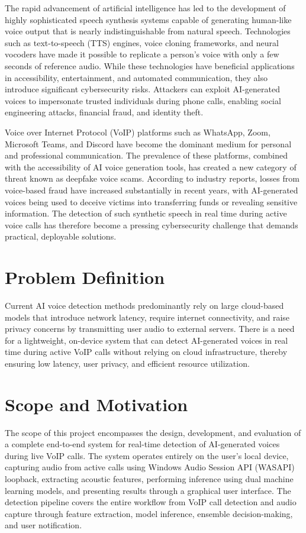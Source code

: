 \documentclass[12pt,a4paper,titlepage]{report}
\begin{document}
	The rapid advancement of artificial intelligence has led to the development of highly sophisticated speech synthesis systems capable of generating human-like voice output that is nearly indistinguishable from natural speech. Technologies such as text-to-speech (TTS) engines, voice cloning frameworks, and neural vocoders have made it possible to replicate a person's voice with only a few seconds of reference audio. While these technologies have beneficial applications in accessibility, entertainment, and automated communication, they also introduce significant cybersecurity risks. Attackers can exploit AI-generated voices to impersonate trusted individuals during phone calls, enabling social engineering attacks, financial fraud, and identity theft.
	
	Voice over Internet Protocol (VoIP) platforms such as WhatsApp, Zoom, Microsoft Teams, and Discord have become the dominant medium for personal and professional communication. The prevalence of these platforms, combined with the accessibility of AI voice generation tools, has created a new category of threat known as deepfake voice scams. According to industry reports, losses from voice-based fraud have increased substantially in recent years, with AI-generated voices being used to deceive victims into transferring funds or revealing sensitive information. The detection of such synthetic speech in real time during active voice calls has therefore become a pressing cybersecurity challenge that demands practical, deployable solutions.
	
	
	\section{Problem Definition}
	
	Current AI voice detection methods predominantly rely on large cloud-based models that introduce network latency, require internet connectivity, and raise privacy concerns by transmitting user audio to external servers. There is a need for a lightweight, on-device system that can detect AI-generated voices in real time during active VoIP calls without relying on cloud infrastructure, thereby ensuring low latency, user privacy, and efficient resource utilization.
	
	
	\section{Scope and Motivation}
	
	The scope of this project encompasses the design, development, and evaluation of a complete end-to-end system for real-time detection of AI-generated voices during live VoIP calls. The system operates entirely on the user's local device, capturing audio from active calls using Windows Audio Session API (WASAPI) loopback, extracting acoustic features, performing inference using dual machine learning models, and presenting results through a graphical user interface. The detection pipeline covers the entire workflow from VoIP call detection and audio capture through feature extraction, model inference, ensemble decision-making, and user notification.
	
\end{document}
